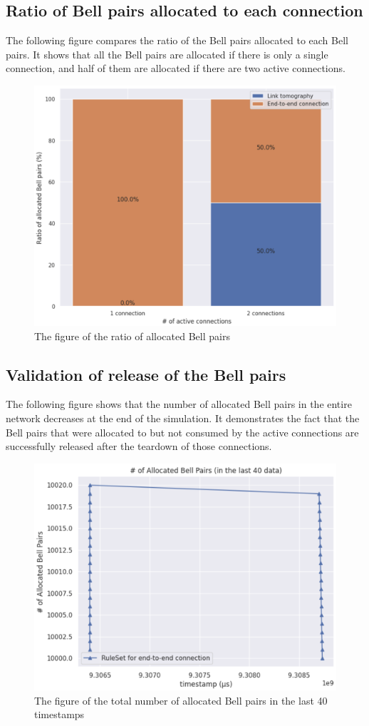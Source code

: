 \newpage

\subsection{Ratio of Bell pairs allocated to each connection}

The following figure compares the ratio of the Bell pairs allocated to each Bell pairs. It shows that all the Bell pairs are allocated if there is only a single connection, and half of them are allocated if there are two active connections.

\begin{figure}[H]
  \centerline{\includegraphics[width=.8\columnwidth]{images/ratio_of_bell_pairs.png}}
  \caption{The figure of the ratio of allocated Bell pairs}
\end{figure}

\subsection{Validation of release of the Bell pairs}

The following figure shows that the number of allocated Bell pairs in the entire network decreases at the end of the simulation.
It demonstrates the fact that the Bell pairs that were allocated to but not consumed by the active connections are successfully released after the teardown of those connections.

\begin{figure}[H]
  \centerline{\includegraphics[width=.8\columnwidth]{images/number_of_bell_pairs.png}}
  \caption{The figure of the total number of allocated Bell pairs in the last 40 timestamps}
\end{figure}



